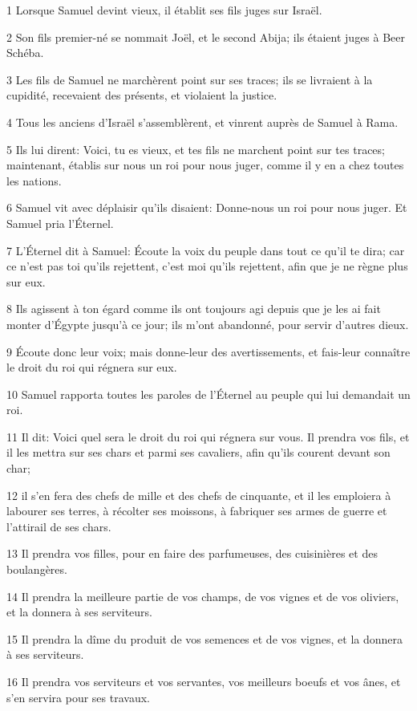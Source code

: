\par 1 Lorsque Samuel devint vieux, il établit ses fils juges sur Israël.
\par 2 Son fils premier-né se nommait Joël, et le second Abija; ils étaient juges à Beer Schéba.
\par 3 Les fils de Samuel ne marchèrent point sur ses traces; ils se livraient à la cupidité, recevaient des présents, et violaient la justice.
\par 4 Tous les anciens d'Israël s'assemblèrent, et vinrent auprès de Samuel à Rama.
\par 5 Ils lui dirent: Voici, tu es vieux, et tes fils ne marchent point sur tes traces; maintenant, établis sur nous un roi pour nous juger, comme il y en a chez toutes les nations.
\par 6 Samuel vit avec déplaisir qu'ils disaient: Donne-nous un roi pour nous juger. Et Samuel pria l'Éternel.
\par 7 L'Éternel dit à Samuel: Écoute la voix du peuple dans tout ce qu'il te dira; car ce n'est pas toi qu'ils rejettent, c'est moi qu'ils rejettent, afin que je ne règne plus sur eux.
\par 8 Ils agissent à ton égard comme ils ont toujours agi depuis que je les ai fait monter d'Égypte jusqu'à ce jour; ils m'ont abandonné, pour servir d'autres dieux.
\par 9 Écoute donc leur voix; mais donne-leur des avertissements, et fais-leur connaître le droit du roi qui régnera sur eux.
\par 10 Samuel rapporta toutes les paroles de l'Éternel au peuple qui lui demandait un roi.
\par 11 Il dit: Voici quel sera le droit du roi qui régnera sur vous. Il prendra vos fils, et il les mettra sur ses chars et parmi ses cavaliers, afin qu'ils courent devant son char;
\par 12 il s'en fera des chefs de mille et des chefs de cinquante, et il les emploiera à labourer ses terres, à récolter ses moissons, à fabriquer ses armes de guerre et l'attirail de ses chars.
\par 13 Il prendra vos filles, pour en faire des parfumeuses, des cuisinières et des boulangères.
\par 14 Il prendra la meilleure partie de vos champs, de vos vignes et de vos oliviers, et la donnera à ses serviteurs.
\par 15 Il prendra la dîme du produit de vos semences et de vos vignes, et la donnera à ses serviteurs.
\par 16 Il prendra vos serviteurs et vos servantes, vos meilleurs boeufs et vos ânes, et s'en servira pour ses travaux.
